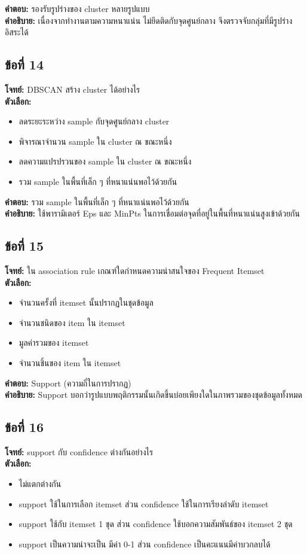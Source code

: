 \documentclass[12pt]{article}
\begin{document}
\textbf{คำตอบ:} รองรับรูปร่างของ cluster หลายรูปแบบ\\
\textbf{คำอธิบาย:} เนื่องจากทำงานตามความหนาแน่น ไม่ยึดติดกับจุดศูนย์กลาง จึงตรวจจับกลุ่มที่มีรูปร่างอิสระได้

\subsection*{ข้อที่ 14}
\textbf{โจทย์:} DBSCAN สร้าง cluster ได้อย่างไร\\
\textbf{ตัวเลือก:}
\begin{itemize}
    \item ลดระยะระหว่าง sample กับจุดศูนย์กลาง cluster
    \item พิจารณาจำนวน sample ใน cluster ณ ขณะหนึ่ง
    \item ลดความแปรปรวนของ sample ใน cluster ณ ขณะหนึ่ง
    \item รวม sample ในพื้นที่เล็ก ๆ ที่หนาแน่นพอไว้ด้วยกัน
\end{itemize}

\textbf{คำตอบ:} รวม sample ในพื้นที่เล็ก ๆ ที่หนาแน่นพอไว้ด้วยกัน\\
\textbf{คำอธิบาย:} ใช้พารามิเตอร์ Eps และ MinPts ในการเชื่อมต่อจุดที่อยู่ในพื้นที่หนาแน่นสูงเข้าด้วยกัน

\subsection*{ข้อที่ 15}
\textbf{โจทย์:} ใน association rule เกณฑ์ใดกำหนดความน่าสนใจของ Frequent Itemset\\
\textbf{ตัวเลือก:}
\begin{itemize}
    \item จำนวนครั้งที่ itemset นั้นปรากฏในชุดข้อมูล
    \item จำนวนชนิดของ item ใน itemset
    \item มูลค่ารวมของ itemset
    \item จำนวนชิ้นของ item ใน itemset
\end{itemize}

\textbf{คำตอบ:} Support (ความถี่ในการปรากฏ)\\
\textbf{คำอธิบาย:} Support บอกว่ารูปแบบพฤติกรรมนั้นเกิดขึ้นบ่อยเพียงใดในภาพรวมของชุดข้อมูลทั้งหมด

\subsection*{ข้อที่ 16}
\textbf{โจทย์:} support กับ confidence ต่างกันอย่างไร\\
\textbf{ตัวเลือก:}
\begin{itemize}
    \item ไม่แตกต่างกัน
    \item support ใช้ในการเลือก itemset ส่วน confidence ใช้ในการเรียงลำดับ itemset
    \item support ใช้กับ itemset 1 ชุด ส่วน confidence ใช้บอกความสัมพันธ์ของ itemset 2 ชุด
    \item support เป็นความน่าจะเป็น มีค่า 0-1 ส่วน confidence เป็นคะแนนมีค่าบวกลบได้
\end{itemize}
\end{document}
